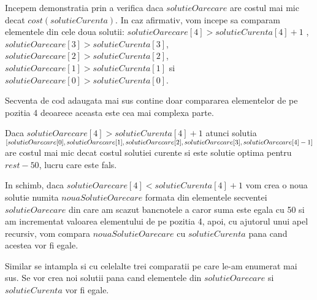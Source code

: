 \begin{enumerate}
\begin{lstlisting}
\end{lstlisting}
\par
Incepem demonstratia prin a verifica daca $solutieOarecare$ are costul mai mic decat  $cost(solutieCurenta)$. In caz afirmativ, vom incepe sa comparam elementele din cele doua solutii: $solutieOarecare[4] > solutieCurenta[4] + 1$ ,\\ $solutieOarecare[3] > solutieCurenta[3]$, $solutieOarecare[2] > solutieCurenta[2]$, $solutieOarecare[1] > solutieCurenta[1]$ si $solutieOarecare[0] > solutieCurenta[0]$.  \par   
Secventa de cod adaugata mai sus contine doar compararea elementelor de pe pozitia 4 deoarece aceasta este cea mai complexa parte. \par
Daca $solutieOarecare[4] > solutieCurenta[4] + 1$  atunci solutia \\ $[solutieOarecare[0], solutieOarecare[1], solutieOarecare[2], solutieOarecare[3], \\ solutieOarecare[4] - 1]$ are costul mai mic decat costul solutiei curente si este solutie optima pentru $rest-50$, lucru care este fals.\par
In schimb, daca $solutieOarecare[4] < solutieCurenta[4] + 1$ vom crea o noua solutie numita $nouaSolutieOarecare$ formata din elementele secventei $solutieOarecare$ din care am scazut bancnotele a caror suma este egala cu 50 si am incrementat valoarea elementului de pe pozitia 4, apoi, cu ajutorul unui apel recursiv, vom compara $nouaSolutieOarecare$ cu $solutieCurenta$ pana cand acestea vor fi egale.\par
Similar se intampla si cu celelalte trei comparatii pe care le-am enumerat mai sus. Se vor crea noi solutii pana cand elementele din $solutieOarecare$ si $solutieCurenta$ vor fi egale.
\end{enumerate}
\vspace{1cm}



